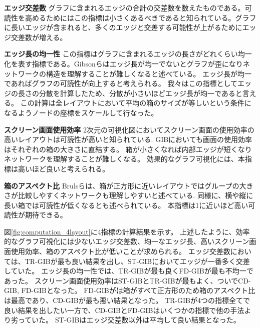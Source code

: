 \documentclass{kuee}
\begin{document}
\begin{description}
  \item{\bf エッジ交差数} グラフに含まれるエッジの合計の交差数を数えたものである。可読性を高めるためにはこの指標は小さくあるべきであると知られている。グラフに長いエッジが含まれると、多くのエッジと交差する可能性が上がるためにエッジ交差数が増える。
  \item{\bf エッジ長の均一性} この指標はグラフに含まれるエッジの長さがどれくらい均一化を表す指標である。Gibsonらはエッジ長が均一でないとグラフが歪になりネットワークの構造を理解することが難しくなると述べている\cite{doi:10.1177/1473871612455749}。
  エッジ長が均一であればグラフの可読性が向上すると考えられる。
  我々はこの指標としてエッジの長さの分散を計算したため、分散が小さいほどエッジ長が均一であると言える。
  この計算は全レイアウトにおいて平均の箱のサイズが等しいという条件になるようノードの座標をスケールして行なった。
  \item{\bf スクリーン画面使用効率} 2次元の可視化図においてスクリーン画面の使用効率の高いレイアウトは可読性が高いと知られている\cite{shneiderman1992tree}.
  GIBにおいても画面の使用効率はそれぞれの箱の大きさに直結する。
  箱が小さくなれば内部エッジが短くなりネットワークを理解することが難しくなる。
  効果的なグラフ可視化には、本指標は高いほど良いと考えられる。
  \item{\bf 箱のアスペクト比}
  Brulsらは、箱が正方形に近いレイアウトではグループの大きさが比較しやすくネットワークも理解しやすいと述べている\cite{bruls2000squarified}.
  同様に、横や縦に長い箱では可読性が低くなるとも述べられている。
  本指標は1に近いほど高い可読性が期待できる。
\end{description}

図\ref{fig:computation_4layout}に4指標の計算結果を示す。
上述したように、効率的なグラフ可視化には少ないエッジ交差数、均一なエッジ長、高いスクリーン画面使用効率、箱のアスペクト比が低いことが求められる。
エッジ交差数においては、TR-GIBが最も良い結果を出し、ST-GIBにおいてエッジが一番多く交差していた。
エッジ長の均一性では、TR-GIBが最も良くFD-GIBが最も不均一であった。
スクリーン画面使用効率はST-GIBとTR-GIBが最もよく、ついでCD-GIB, FD-GIBとなった。
FD-GIBがは箱がすべて正方形のため箱のアスペクト比は最高であり、CD-GIBが最も悪い結果となった。
TR-GIBが4つの指標全てで良い結果を出したい一方で、CD-GIBとFD-GIBはいくつかの指標で他の手法より劣っていた。
ST-GIBはエッジ交差数以外は平均して良い結果となった。
\end{document}
